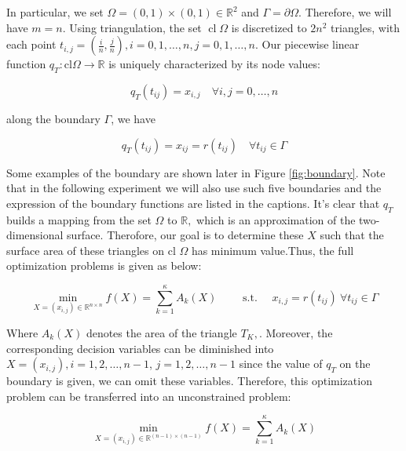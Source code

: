 In particular, we set $\Omega=(0,1) \times(0,1) \in \mathbb R^{2}$ and $\Gamma=\partial \Omega$. Therefore, we will have $m=n$. Using triangulation, the set $\operatorname{cl} \Omega$ is discretized to $2 n^{2}$ triangles, with each point $t_{i, j}=\left(\frac{i}{n}, \frac{j}{n}\right), i=0,1, \ldots, n, j=0,1, \ldots, n .$ Our piecewise linear function $q_{T}: \mathrm{cl} \Omega \rightarrow \mathbb{R}$ is uniquely characterized by its node values:

\begin{equation}
    q_{T}\left(t_{i j}\right)=x_{i, j} \quad \forall i, j=0, \ldots, n
\end{equation}

along the boundary $\Gamma$, we have 

\begin{equation}
q_{T}\left(t_{i j}\right)=x_{i j}=r\left(t_{i j}\right) \quad \forall t_{i j} \in \Gamma
\end{equation}

Some examples of the boundary are shown later in Figure \ref{fig:boundary}. Note that in the following experiment we will also use such five boundaries and the expression of the boundary functions are listed in the captions. It's clear that $q_{T}$ builds a mapping from the set $\Omega$ to $\mathbb{R},$ which is an approximation of the two-dimensional surface.
Therofore, our goal is to determine these $X$ such that the surface area of these triangles on cl $\Omega$ has minimum value.Thus, the full optimization problems is given as below:

\begin{equation}
\min _{X=\left(x_{i, j}\right) \in \mathbb{R}^{n \times n}} f(X)=\sum_{k=1}^{\kappa} A_{k}(X) \qquad \text { s.t. } \quad x_{i, j}=r\left(t_{i j}\right) \ \forall t_{i j} \in \Gamma
\end{equation}

Where $A_{k}(X)$ denotes the area of the triangle $T_{K},$. Moreover, the corresponding decision variables can be diminished into $X=\left(x_{i, j}\right), i=1,2, \ldots, n-1$, $j=1,2, \ldots, n-1$
since the value of $q_{T}$ on the boundary is given, we can omit these variables. Therefore, this optimization problem can be transferred into an unconstrained problem:

\begin{equation}
\min _{X=\left(x_{i, j}\right) \in \mathbb{R}^{(n-1) \times(n-1)}} f(X)=\sum_{k=1}^{\kappa} A_{k}(X)
\end{equation}

